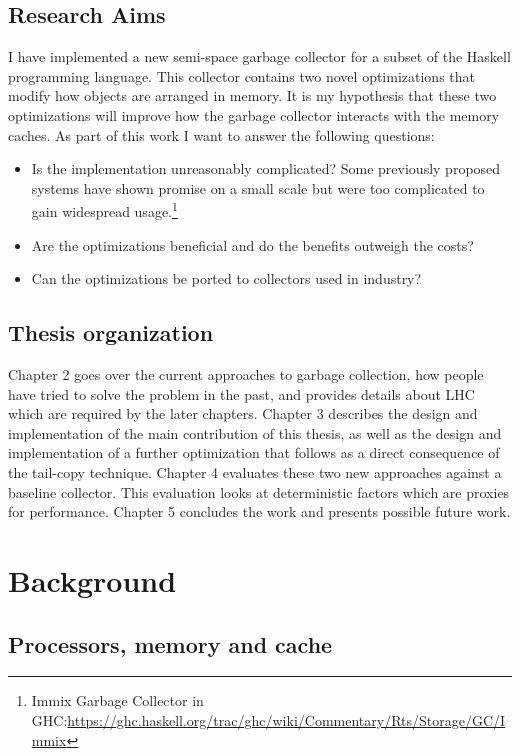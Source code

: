 \documentclass[a4paper,oneside]{memoir}
\begin{document}
\section{Research Aims}
I have implemented a new semi-space garbage collector for a subset of the
Haskell programming language. This collector contains two novel optimizations
that modify how objects are arranged in memory. It is my hypothesis that these
two optimizations will improve how the garbage collector interacts with the
memory caches. As part of this work I want to answer the following questions:
\begin{itemize}
  \item Is the implementation unreasonably complicated? Some previously proposed
    systems have shown promise on a small scale but were too complicated to
    gain widespread usage.\footnote{Immix Garbage Collector in GHC:\url{https://ghc.haskell.org/trac/ghc/wiki/Commentary/Rts/Storage/GC/Immix}}
  \item Are the optimizations beneficial and do the benefits outweigh the costs?
  \item Can the optimizations be ported to collectors used in industry?
\end{itemize}

\section{Thesis organization}
Chapter 2 goes over the current approaches to garbage collection, how people
have tried to solve the problem in the past, and provides details about
LHC which are required by the later chapters.
Chapter 3 describes the design and implementation of the main contribution of
this thesis, as well as the design and implementation of a further optimization
that follows as a direct consequence of the tail-copy technique.
Chapter 4 evaluates these two new approaches against a baseline collector. This
evaluation looks at deterministic factors which are proxies for performance.
Chapter 5 concludes the work and presents possible future work.

\chapter{Background}
\label{background}

\section{Processors, memory and cache}
\end{document}
